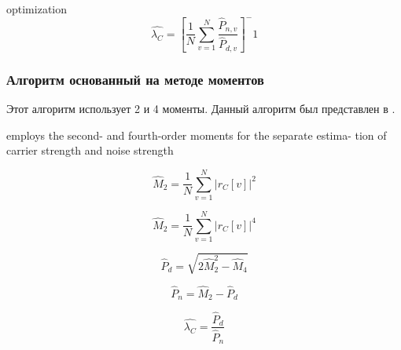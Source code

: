 \begin{center}optimization
\begin{equation}
	\hat{\lambda_C} = [ \frac{1}{N} \sum \limits_{v=1}^{N} \frac{\hat P_{n,v}}{\hat P_{d,v}} ]^-1
\end{equation}
\end{center}

\subsubsection{Алгоритм основанный на методе моментов}
\label{sssec:mm}

Этот алгоритм использует 2 и 4 моменты. Данный алгоритм был представлен в \cite{snr_pauluzzi}.

employs
the second- and fourth-order
moments for the separate estima-
tion of carrier strength and noise
strength
\begin{center}
\begin{equation}
	\hat M_2 = \frac{1}{N} \sum \limits_{v=1}^{N} \left|r_C[v] \right| ^2
\end{equation}
\end{center}

\begin{center}
\begin{equation}
	\hat M_2 = \frac{1}{N} \sum \limits_{v=1}^{N} \left|r_C[v] \right| ^4
\end{equation}
\end{center}

\begin{center}
\begin{equation}
	\hat P_d = \sqrt{2 \hat M^2_2 - \hat M_4} 
\end{equation}
\end{center}

\begin{center}
\begin{equation}
	\hat P_n = \hat M_2 - \hat P_d
\end{equation}
\end{center}

\begin{center}
\begin{equation}
	\hat{\lambda_C} = \frac{\hat P_d}{\hat P_n}
\end{equation}
\end{center}


